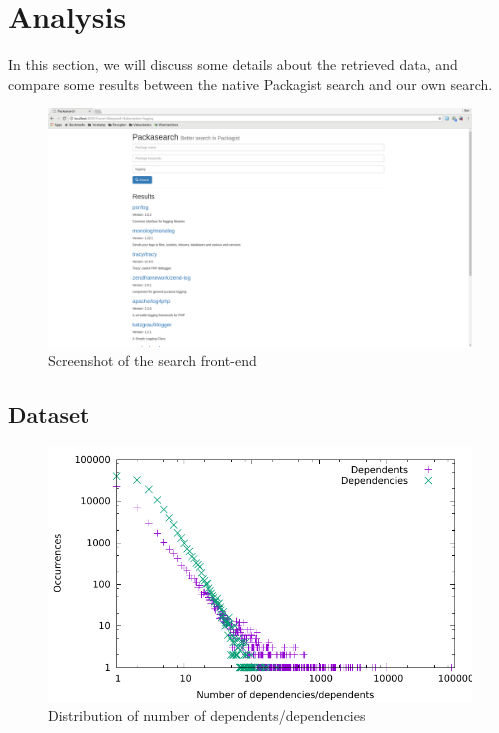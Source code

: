 \documentclass{article}
\begin{document}
\section{Analysis}

In this section, we will discuss some details about the retrieved data, and compare some results between the native Packagist search and our own search.


\begin{figure}
	\centering
	\includegraphics[width=\textwidth]{screenshot}
	\caption{Screenshot of the search front-end}
	\label{fig:screenshot}
\end{figure}

\subsection{Dataset}

\begin{figure}
	\centering
	\includegraphics[width=\textwidth]{dependencies}
	\caption{Distribution of number of dependents/dependencies}
	\label{fig:dependencies}
\end{figure}
\end{document}
